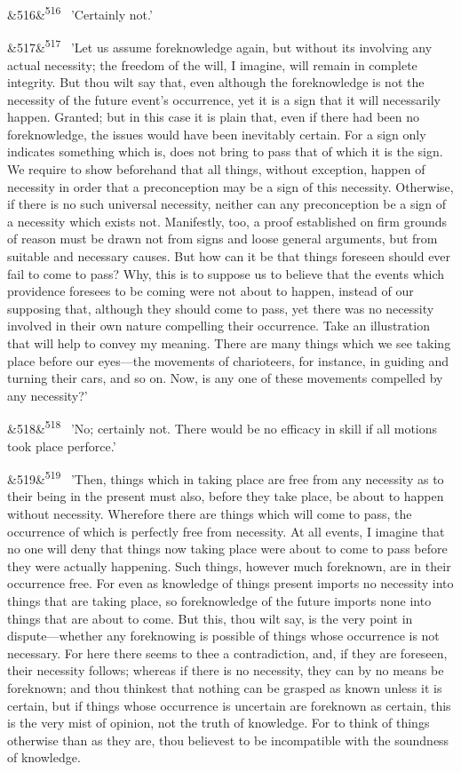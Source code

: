 \documentclass[12pt]{article}
\newcommand{\para}[1][]{\par\noindent\ifx&#1&\else\textsuperscript{\footnotesize #1}~\fi}
\begin{document}
\para[516] 'Certainly not.'

\para[517] 'Let us assume foreknowledge again, but without its involving any actual necessity; the freedom of the will, I imagine, will remain in complete integrity. But thou wilt say that, even although the foreknowledge is not the necessity of the future event's occurrence, yet it is a sign that it will necessarily happen. Granted; but in this case it is plain that, even if there had been no foreknowledge, the issues would have been inevitably certain. For a sign only indicates something which is, does not bring to pass that of which it is the sign. We require to show beforehand that all things, without exception, happen of necessity in order that a preconception may be a sign of this necessity. Otherwise, if there is no such universal necessity, neither can any preconception be a sign of a necessity which exists not. Manifestly, too, a proof established on firm grounds of reason must be drawn not from signs and loose general arguments, but from suitable and necessary causes. But how can it be that things foreseen should ever fail to come to pass? Why, this is to suppose us to believe that the events which providence foresees to be coming were not about to happen, instead of our supposing that, although they should come to pass, yet there was no necessity involved in their own nature compelling their occurrence. Take an illustration that will help to convey my meaning. There are many things which we see taking place before our eyes---the movements of charioteers, for instance, in guiding and turning their cars, and so on. Now, is any one of these movements compelled by any necessity?'

\para[518] 'No; certainly not. There would be no efficacy in skill if all motions took place perforce.'

\para[519] 'Then, things which in taking place are free from any necessity as to their being in the present must also, before they take place, be about to happen without necessity. Wherefore there are things which will come to pass, the occurrence of which is perfectly free from necessity. At all events, I imagine that no one will deny that things now taking place were about to come to pass before they were actually happening. Such things, however much foreknown, are in their occurrence free. For even as knowledge of things present imports no necessity into things that are taking place, so foreknowledge of the future imports none into things that are about to come. But this, thou wilt say, is the very point in dispute---whether any foreknowing is possible of things whose occurrence is not necessary. For here there seems to thee a contradiction, and, if they are foreseen, their necessity follows; whereas if there is no necessity, they can by no means be foreknown; and thou thinkest that nothing can be grasped as known unless it is certain, but if things whose occurrence is uncertain are foreknown as certain, this is the very mist of opinion, not the truth of knowledge. For to think of things otherwise than as they are, thou believest to be incompatible with the soundness of knowledge.
\end{document}

